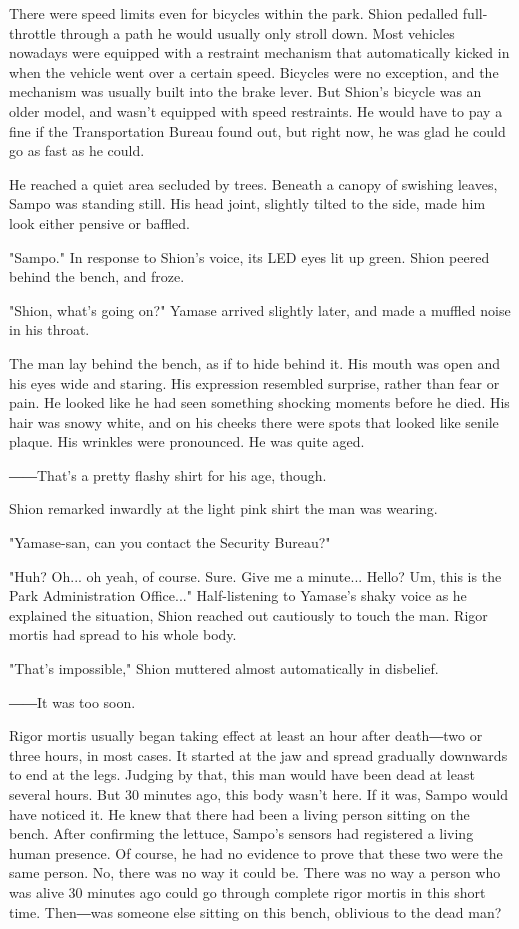 There were speed limits even for bicycles within the park. Shion
pedalled full-throttle through a path he would usually only stroll down.
Most vehicles nowadays were equipped with a restraint mechanism that
automatically kicked in when the vehicle went over a certain speed.
Bicycles were no exception, and the mechanism was usually built into the
brake lever. But Shion's bicycle was an older model, and wasn't equipped
with speed restraints. He would have to pay a fine if the Transportation
Bureau found out, but right now, he was glad he could go as fast as he
could.

He reached a quiet area secluded by trees. Beneath a canopy of swishing
leaves, Sampo was standing still. His head joint, slightly tilted to the
side, made him look either pensive or baffled.

"Sampo." In response to Shion's voice, its LED eyes lit up green. Shion
peered behind the bench, and froze.

"Shion, what's going on?" Yamase arrived slightly later, and made a
muffled noise in his throat.

The man lay behind the bench, as if to hide behind it. His mouth was
open and his eyes wide and staring. His expression resembled surprise,
rather than fear or pain. He looked like he had seen something shocking
moments before he died. His hair was snowy white, and on his cheeks
there were spots that looked like senile plaque. His wrinkles were
pronounced. He was quite aged.

――That's a pretty flashy shirt for his age, though.

Shion remarked inwardly at the light pink shirt the man was wearing.

"Yamase-san, can you contact the Security Bureau?"

"Huh? Oh... oh yeah, of course. Sure. Give me a minute... Hello? Um,
this is the Park Administration Office..." Half-listening to Yamase's
shaky voice as he explained the situation, Shion reached out cautiously
to touch the man. Rigor mortis had spread to his whole body.

"That's impossible," Shion muttered almost automatically in disbelief.

――It was too soon.

Rigor mortis usually began taking effect at least an hour after
death―two or three hours, in most cases. It started at the jaw and
spread gradually downwards to end at the legs. Judging by that, this man
would have been dead at least several hours. But 30 minutes ago, this
body wasn't here. If it was, Sampo would have noticed it. He knew that
there had been a living person sitting on the bench. After confirming
the lettuce, Sampo's sensors had registered a living human presence. Of
course, he had no evidence to prove that these two were the same person.
No, there was no way it could be. There was no way a person who was
alive 30 minutes ago could go through complete rigor mortis in this
short time. Then―was someone else sitting on this bench, oblivious to
the dead man?

